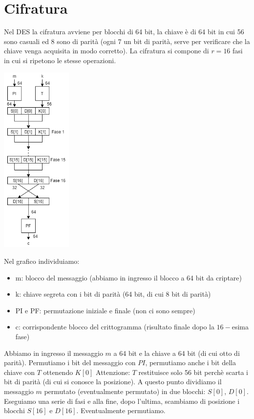\section{Cifratura}
Nel DES la cifratura avviene per blocchi di 64 bit, la chiave è di 64 bit in cui 56 sono casuali ed 8 sono di parità (ogni 7 un bit di parità, serve per verificare che la chiave venga acquisita in modo corretto).
La cifratura si compone di $r=16$ fasi in cui si ripetono le stesse operazioni.
\begin{center}
	\includegraphics[width = 100pt]{images/DES_1.png}
\end{center} 
Nel grafico individuiamo:
\begin{itemize}
	\item m: blocco del messaggio (abbiamo in ingresso il blocco a 64 bit da criptare)
	\item k: chiave segreta con i bit di parità (64 bit, di cui 8 bit di parità)
	\item PI e PF: permutazione iniziale e finale (non ci sono sempre)
	\item c: corrispondente blocco del crittogramma (risultato finale dopo la $16-$esima fase)
\end{itemize}
Abbiamo in ingresso il messaggio $m$ a 64 bit e la chiave a 64 bit (di cui otto di parità). Permutiamo i bit del messaggio con $PI$, permutiamo anche i bit della chiave con $T$ ottenendo $K[0]$ Attenzione: $T$ restituisce solo 56 bit perchè scarta i bit di parità (di cui si conosce la posizione). A questo punto dividiamo il messaggio $m$ permutato (eventualmente permutato) in due blocchi: $S[0]$, $D[0]$. Eseguiamo una serie di fasi e alla fine, dopo l'ultima, scambiamo di posizione i blocchi $S[16]$ e $D[16]$. Eventualmente permutiamo.



